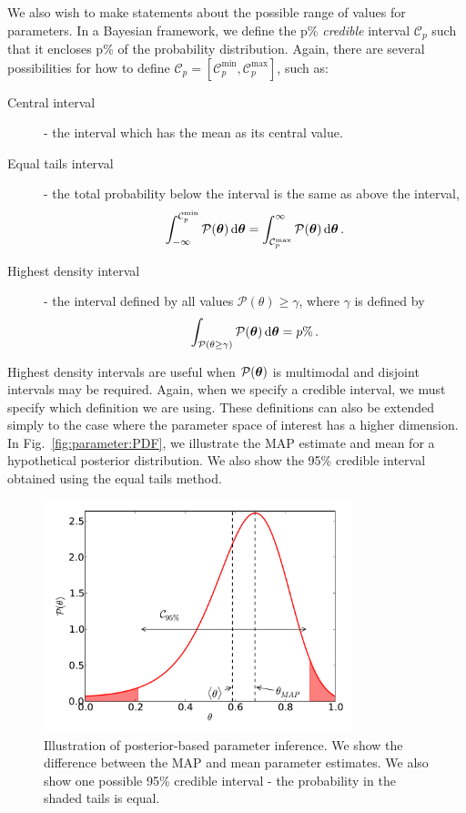 We also wish to make statements about the possible range of values for parameters. In a Bayesian framework, we define the p\% \textit{credible} interval $\mathcal{C}_{p}$ such that it encloses p\% of the probability distribution. Again, there are several possibilities for how to define $\mathcal{C}_{p} = [\mathcal{C}_{p}^\textrm{min}, \mathcal{C}_{p}^\textrm{max}]$, such as:
\begin{description}
\item[Central interval] - the interval which has the mean as its central value.
\item[Equal tails interval] - the total probability below the interval is the same as above the interval,
\begin{equation}
\int_{-\infty}^{\mathcal{C}_{p}^\textrm{min}} \mathcal{P}(\boldsymbol\theta) \, \mathrm{d}\boldsymbol\theta = \int_{\mathcal{C}_{p}^\textrm{max}}^{\infty} \mathcal{P}(\boldsymbol\theta) \, \mathrm{d}\boldsymbol\theta\,.
\end{equation}
\item[Highest density interval] - the interval defined by all values $\mathcal{P}(\theta) \geq \gamma$, where $\gamma$ is defined by
\begin{equation}
\int_{\mathcal{P}(\theta \geq \gamma)} \mathcal{P}(\boldsymbol\theta) \, \mathrm{d}\boldsymbol\theta = p\%\,.
\end{equation}
\end{description}
Highest density intervals are useful when $\mathcal{P}(\boldsymbol\theta)$ is multimodal and disjoint intervals may be required. Again, when we specify a credible interval, we must specify which definition we are using. These definitions can also be extended simply to the case where the parameter space of interest has a higher dimension. In Fig.~\ref{fig:parameter:PDF}, we illustrate the MAP estimate and mean for a hypothetical posterior distribution. We also show the 95\% credible interval obtained using the equal tails method.

\begin{figure}[t]
\centering
  \includegraphics[width=0.8\textwidth]{ParamRecon/PDF.pdf}
  \caption[Posterior-based parameter inference]{Illustration of posterior-based parameter inference. We show the difference between the MAP and mean parameter estimates. We also show one possible 95\% credible interval - the probability in the shaded tails is equal.}
  \label{fig:parameter:likelihood}
\end{figure}


